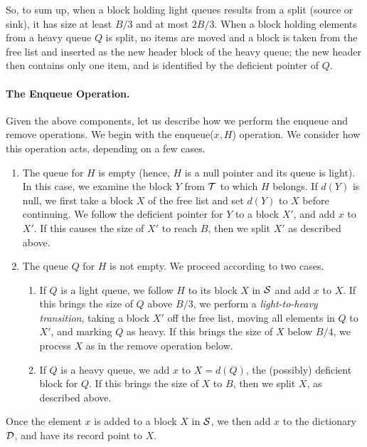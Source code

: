 \documentclass[11pt,letterpaper]{article}
\begin{document}
So, to sum up, when a block holding light queues 
results from a split (source or sink), it has size
at least $B/3$ and at most $2B/3$. When a block holding elements
from a heavy queue $Q$ is split, no items are moved and a block is taken
from the free list and inserted as the new header block of the heavy queue; the new header then contains only one item,
and is identified by the deficient pointer of $Q$. 

\paragraph{The Enqueue Operation.}
Given the above components,
let us describe how we 
perform the enqueue and remove operations.
We begin with the enqueue($x,H$) operation.
We consider how this operation acts, depending on a few cases.

\begin{enumerate}
\item
The queue for $H$ is empty (hence, $H$ is a null pointer 
and its queue is light).
In this case, we examine the block $Y$ from $\cal T$ to which $H$ belongs.
If $d(Y)$ is null, we first take a block $X$ of the free list and set $d(Y)$ to $X$ before continuing. 
We follow the deficient pointer for $Y$ to a block $X'$, and add $x$ to $X'$. If this causes
the size of $X'$ to reach $B$, then we split $X'$ as described above. 
\item
The queue $Q$ for $H$ is not empty. We proceed according to two cases.
\begin{enumerate}
\item If $Q$ is a light queue, we follow $H$ to its block $X$ in $\cal S$ and add $x$ to $X$. If this
brings the size of $Q$ above $B/3$, we perform a \emph{light-to-heavy transition}, taking a block $X'$ off the free list, moving all elements in $Q$
to $X'$, and marking $Q$ as heavy. If this brings the size of $X$ below $B/4$, we process $X$ as in the remove operation below.
\item If $Q$ is a heavy queue, we add $x$ to $X=d(Q)$, the (possibly) deficient block for $Q$.
If this brings the size of $X$ to $B$, then we split $X$, as described
above.
\end{enumerate}
\end{enumerate}
Once the element $x$ is added to a block $X$ in $\cal S$, we then add
$x$ to the dictionary $\cal D$, and have its record point to $X$.
\end{document}

